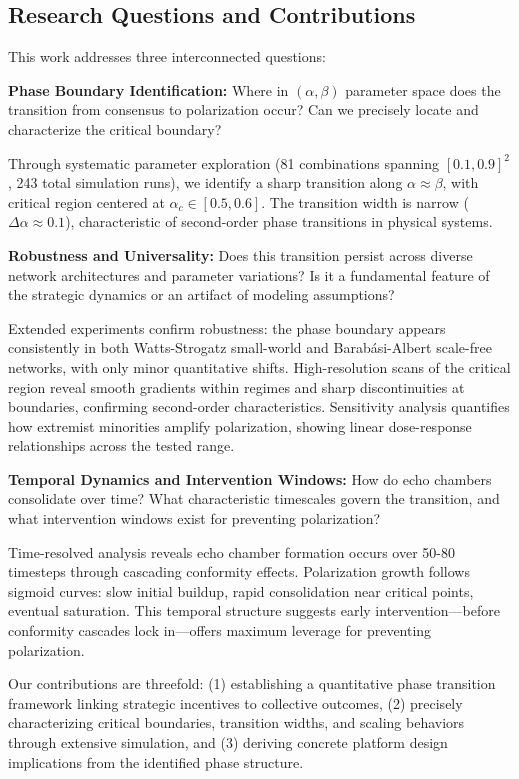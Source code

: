 \documentclass[11pt,a4paper]{article}
\begin{document}
\subsection{Research Questions and Contributions}

This work addresses three interconnected questions:

\textbf{Phase Boundary Identification:} Where in $(\alpha, \beta)$ parameter space does the transition from consensus to polarization occur? Can we precisely locate and characterize the critical boundary?

Through systematic parameter exploration (81 combinations spanning $[0.1, 0.9]^2$, 243 total simulation runs), we identify a sharp transition along $\alpha \approx \beta$, with critical region centered at $\alpha_c \in [0.5, 0.6]$. The transition width is narrow ($\Delta\alpha \approx 0.1$), characteristic of second-order phase transitions in physical systems.

\textbf{Robustness and Universality:} Does this transition persist across diverse network architectures and parameter variations? Is it a fundamental feature of the strategic dynamics or an artifact of modeling assumptions?

Extended experiments confirm robustness: the phase boundary appears consistently in both Watts-Strogatz small-world and Barabási-Albert scale-free networks, with only minor quantitative shifts. High-resolution scans of the critical region reveal smooth gradients within regimes and sharp discontinuities at boundaries, confirming second-order characteristics. Sensitivity analysis quantifies how extremist minorities amplify polarization, showing linear dose-response relationships across the tested range.

\textbf{Temporal Dynamics and Intervention Windows:} How do echo chambers consolidate over time? What characteristic timescales govern the transition, and what intervention windows exist for preventing polarization?

Time-resolved analysis reveals echo chamber formation occurs over 50-80 timesteps through cascading conformity effects. Polarization growth follows sigmoid curves: slow initial buildup, rapid consolidation near critical points, eventual saturation. This temporal structure suggests early intervention—before conformity cascades lock in—offers maximum leverage for preventing polarization.

Our contributions are threefold: (1) establishing a quantitative phase transition framework linking strategic incentives to collective outcomes, (2) precisely characterizing critical boundaries, transition widths, and scaling behaviors through extensive simulation, and (3) deriving concrete platform design implications from the identified phase structure.
\end{document}
